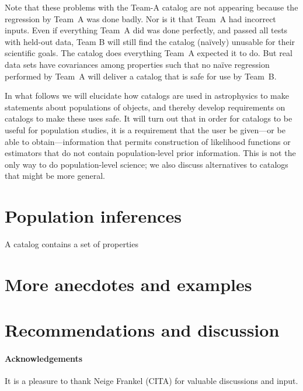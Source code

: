 \documentclass[10pt]{article}
\begin{document}
Note that these problems with the Team-A catalog are not appearing because the regression by Team~A was done badly.
Nor is it that Team~A had incorrect inputs.
Even if everything Team~A did was done perfectly, and passed all tests with held-out data, Team B will still find the catalog (na\"ively) unusable for their scientific goals.
The catalog does everything Team~A expected it to do.
But real data sets have covariances among properties such that no na\"ive regression performed by Team~A will deliver a catalog that is safe for use by Team~B.

In what follows we will elucidate how catalogs are used in astrophysics to make statements about populations of objects, and thereby develop requirements on catalogs to make these uses safe.
It will turn out that in order for catalogs to be useful for population studies, it is a requirement that the user be given---or be able to obtain---information that permits construction of likelihood functions or estimators that do not contain population-level prior information.
This is not the only way to do population-level science; we also discuss alternatives to catalogs that might be more general.

\section{Population inferences}

A catalog contains a set of properties

\section{More anecdotes and examples}

\section{Recommendations and discussion}

\paragraph{Acknowledgements}
It is a pleasure to thank
  Neige Frankel (CITA)
for valuable discussions and input.


\raggedright

\end{document}
